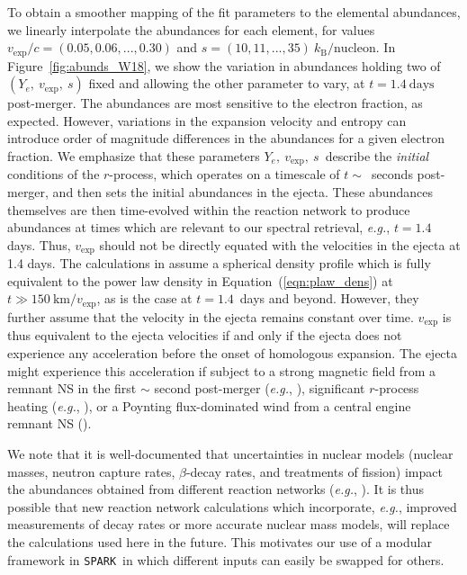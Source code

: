 \documentclass[twocolumn, twocolappendix]{aastex63}
\def\SPARK{\texttt{SPARK}}
\def\eg{{\it e.g.}}
\begin{document}
To obtain a smoother mapping of the fit parameters to the elemental abundances, we linearly interpolate the abundances for each element, for values $v_{\mathrm{exp}}/c = (0.05, 0.06, ..., 0.30)$ and $s = (10, 11, ..., 35)~k_{\mathrm{B}}/\mathrm{nucleon}$. In Figure~\ref{fig:abunds_W18}, we show the variation in abundances holding two of $(Y_e,~v_{\mathrm{exp}},~s)$ fixed and allowing the other parameter to vary, at $t = 1.4~\mathrm{days}$ post-merger. The abundances are most sensitive to the electron fraction, as expected. However, variations in the expansion velocity and entropy can introduce order of magnitude differences in the abundances for a given electron fraction. We emphasize that these parameters $Y_e,~v_{\mathrm{exp}},~s$~describe the \textit{initial} conditions of the $r$-process, which operates on a timescale of $t \sim$~seconds post-merger, and then sets the initial abundances in the ejecta. These abundances themselves are then time-evolved within the reaction network to produce abundances at times which are relevant to our spectral retrieval, \eg, $t = 1.4$ days. Thus, $v_{\mathrm{exp}}$ should not be directly equated with the velocities in the ejecta at 1.4 days. The calculations in \cite{wanajo18} assume a spherical density profile which is fully equivalent to the power law density in Equation~(\ref{eqn:plaw_dens}) at $t \gg 150~\mathrm{km} / v_{\mathrm{exp}}$, as is the case at $t = 1.4$~days and beyond. However, they further assume that the velocity in the ejecta remains constant over time. $v_{\mathrm{exp}}$ is thus equivalent to the ejecta velocities if and only if the ejecta does not experience any acceleration before the onset of homologous expansion. The ejecta might experience this acceleration if subject to a strong magnetic field from a remnant NS in the first $\sim$ second post-merger (\eg, \citealt{metzger18}), significant $r$-process heating (\eg, \citealt{klion22}), or a Poynting flux-dominated wind from a central engine remnant NS (\citealt{ai22}). 

We note that it is well-documented that uncertainties in nuclear models (nuclear masses, neutron capture rates, $\beta$-decay rates, and treatments of fission) impact the abundances obtained from different reaction networks (\textit{e.g.}, \citealt{eichler15, eichler19, barnes16, barnes21, mumpower16, cote18, zhu21, kullmann22b}). It is thus possible that new reaction network calculations which incorporate, \eg, improved measurements of decay rates or more accurate nuclear mass models, will replace the calculations used here in the future. This motivates our use of a modular framework in \SPARK~in which different inputs can easily be swapped for others.
\end{document}
